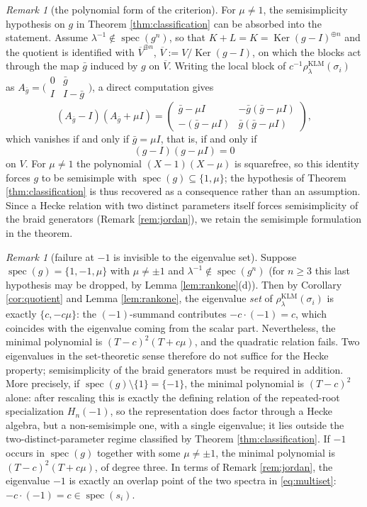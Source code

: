 \documentclass[11pt]{article}
\theoremstyle{definition}
\theoremstyle{remark}
\newtheorem{remark}[theorem]{Remark}
\newcommand{\Ker}{\operatorname{Ker}}
\newcommand{\spec}{\operatorname{spec}}
\newcommand{\rKLM}{\rho^{\mathrm{KLM}}_{\lambda}}
\begin{document}
\begin{remark}[the polynomial form of the criterion]\label{rem:absorb}
For $\mu \neq 1$, the semisimplicity hypothesis on $g$ in Theorem
\ref{thm:classification} can be absorbed into the statement. Assume
$\lambda^{-1} \notin \spec(g^n)$, so that $K + L = K =
\Ker(g - I)^{\oplus n}$ and the quotient is identified with
$\overline{V}^{\oplus n}$, $\overline{V} := V/\Ker(g - I)$, on which the
blocks act through the map $\bar g$ induced by $g$ on $\overline{V}$. Writing the local block of
$c^{-1}\rKLM(\sigma_i)$ as
$A_{\bar g} = \bigl(\begin{smallmatrix} 0 & \bar g \\ I & I - \bar g
\end{smallmatrix}\bigr)$, a direct computation gives
\[
(A_{\bar g} - I)(A_{\bar g} + \mu I)
=
\begin{pmatrix}
\bar g - \mu I & -\bar g(\bar g - \mu I) \\
-(\bar g - \mu I) & \bar g(\bar g - \mu I)
\end{pmatrix},
\]
which vanishes if and only if $\bar g = \mu I$, that is, if and only if
\[
(g - I)(g - \mu I) = 0
\]
on $V$. For $\mu \neq 1$ the polynomial $(X - 1)(X - \mu)$ is
squarefree, so this identity forces $g$ to be semisimple with
$\spec(g) \subseteq \{1, \mu\}$; the hypothesis of Theorem
\ref{thm:classification} is thus recovered as a consequence rather than
an assumption. Since a Hecke relation with two distinct parameters
itself forces semisimplicity of the braid generators (Remark
\ref{rem:jordan}), we retain the semisimple formulation in the theorem.
\end{remark}

\begin{remark}[failure at $-1$ is invisible to the eigenvalue
set]\label{rem:minusone}
Suppose $\spec(g) = \{1, -1, \mu\}$ with $\mu \neq \pm 1$ and
$\lambda^{-1} \notin \spec(g^n)$ (for $n \geq 3$ this last hypothesis
may be dropped, by Lemma \ref{lem:rankone}(d)). Then by Corollary \ref{cor:quotient}
and Lemma \ref{lem:rankone}, the eigenvalue \emph{set} of
$\rKLM(\sigma_i)$ is exactly $\{c, -c\mu\}$: the $(-1)$-summand
contributes $-c\cdot(-1) = c$, which coincides with the eigenvalue coming
from the scalar part. Nevertheless, the minimal polynomial is
$(T - c)^2 (T + c\mu)$, and the quadratic relation fails. Two eigenvalues
in the set-theoretic sense therefore do not suffice for the Hecke
property; semisimplicity of the braid generators must be required in
addition. More precisely, if $\spec(g)\setminus\{1\} = \{-1\}$, the
minimal polynomial is $(T - c)^2$ alone: after rescaling this is
exactly the defining relation of the repeated-root specialization
$H_n(-1)$, so the representation does factor through a Hecke algebra,
but a non-semisimple one, with a single eigenvalue; it lies outside the
two-distinct-parameter regime classified by Theorem
\ref{thm:classification}. If $-1$ occurs in $\spec(g)$ together with
some $\mu \neq \pm 1$, the
minimal polynomial is $(T - c)^2(T + c\mu)$, of degree three. In terms
of Remark \ref{rem:jordan}, the eigenvalue $-1$ is exactly an overlap
point of the two spectra in \eqref{eq:multiset}:
$-c\cdot(-1) = c \in \spec(s_i)$.
\end{remark}
\end{document}
